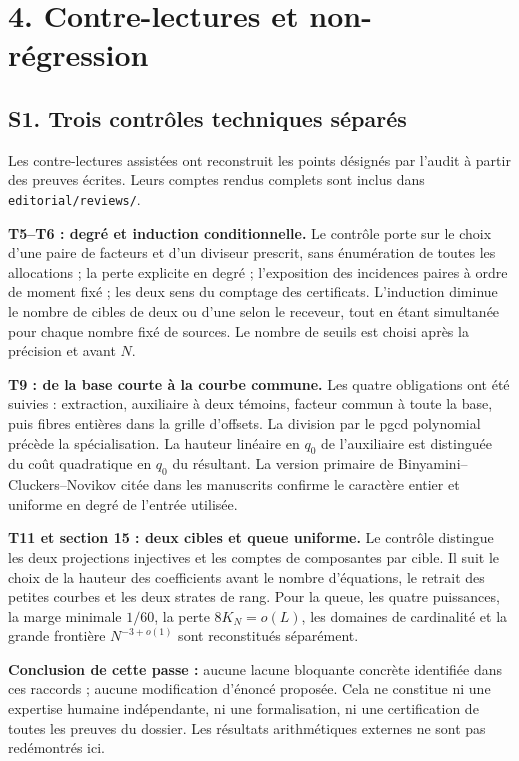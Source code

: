 \documentclass[11pt,a4paper]{article}
\begin{document}
\clearpage
\section*{4. Contre-lectures et non-régression}
\subsection*{S1. Trois contrôles techniques séparés}
Les contre-lectures assistées ont reconstruit les points désignés
par l'audit à partir des preuves écrites. Leurs comptes rendus
complets sont inclus dans \texttt{editorial/reviews/}.

\textbf{T5--T6 : degré et induction conditionnelle.}
Le contrôle porte sur le choix d'une paire de facteurs et d'un
diviseur prescrit, sans énumération de toutes les allocations ;
la perte explicite en degré ; l'exposition des incidences paires à
ordre de moment fixé ; les deux sens du comptage des certificats.
L'induction diminue le nombre de cibles de deux ou d'une selon le
receveur, tout en étant simultanée pour chaque nombre fixé de sources.
Le nombre de seuils est choisi après la précision et avant \(N\).

\textbf{T9 : de la base courte à la courbe commune.}
Les quatre obligations ont été suivies : extraction, auxiliaire
à deux témoins, facteur commun à toute la base, puis fibres entières
dans la grille d'offsets. La division par le pgcd polynomial précède
la spécialisation. La hauteur linéaire en \(q_0\) de l'auxiliaire est
distinguée du coût quadratique en \(q_0\) du résultant. La version
primaire de Binyamini--Cluckers--Novikov citée dans les manuscrits
confirme le caractère entier et uniforme en degré de l'entrée utilisée.

\textbf{T11 et section 15 : deux cibles et queue uniforme.}
Le contrôle distingue les deux projections injectives et les comptes
de composantes par cible. Il suit le choix de la hauteur des coefficients
avant le nombre d'équations, le retrait des petites courbes et les deux
strates de rang. Pour la queue, les quatre puissances, la marge minimale
\(1/60\), la perte \(8K_N=o(L)\), les domaines de cardinalité et la
grande frontière \(N^{-3+o(1)}\) sont reconstitués séparément.

\textbf{Conclusion de cette passe :} aucune lacune bloquante concrète
identifiée dans ces raccords ; aucune modification d'énoncé proposée.
Cela ne constitue ni une expertise humaine indépendante, ni une
formalisation, ni une certification de toutes les preuves du dossier.
Les résultats arithmétiques externes ne sont pas redémontrés ici.
\end{document}
